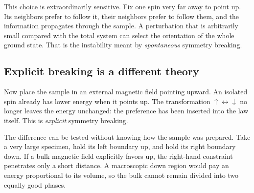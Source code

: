 This choice is extraordinarily sensitive. Fix one spin very far away to point
up. Its neighbors prefer to follow it, their neighbors prefer to follow them,
and the information propagates through the sample. A perturbation that is
arbitrarily small compared with the total system can select the orientation
of the whole ground state. That is the instability meant by
\emph{spontaneous} symmetry breaking.

\begin{classroomqa}
\end{classroomqa}

\begin{classroomqa}
\end{classroomqa}

\subsection{Explicit breaking is a different theory}

Now place the sample in an external magnetic field pointing upward. An
isolated spin already has lower energy when it points up. The transformation
\(\uparrow\leftrightarrow\downarrow\) no longer leaves the energy unchanged:
the preference has been inserted into the law itself. This is \emph{explicit}
symmetry breaking.

The difference can be tested without knowing how the sample was prepared.
Take a very large specimen, hold its left boundary up, and hold its right
boundary down. If a bulk magnetic field explicitly favors up, the right-hand
constraint penetrates only a short distance. A macroscopic down region would
pay an energy proportional to its volume, so the bulk cannot remain divided
into two equally good phases.

